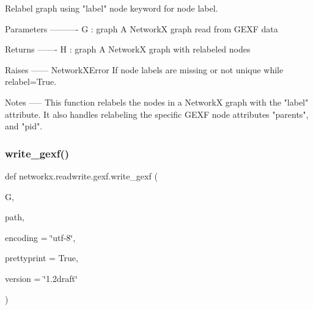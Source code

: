 \begin{DoxyVerb}Relabel graph using "label" node keyword for node label.

Parameters
----------
G : graph
   A NetworkX graph read from GEXF data

Returns
-------
H : graph
  A NetworkX graph with relabeled nodes

Raises
------
NetworkXError
    If node labels are missing or not unique while relabel=True.

Notes
-----
This function relabels the nodes in a NetworkX graph with the
"label" attribute.  It also handles relabeling the specific GEXF
node attributes "parents", and "pid".
\end{DoxyVerb}
 \mbox{\label{namespacenetworkx_1_1readwrite_1_1gexf_a845d783cb876a84982ea1eb9707055d9}} 
\subsubsection{\texorpdfstring{write\+\_\+gexf()}{write\_gexf()}}
{\footnotesize\ttfamily def networkx.\+readwrite.\+gexf.\+write\+\_\+gexf (\begin{DoxyParamCaption}\item[{}]{G,  }\item[{}]{path,  }\item[{}]{encoding = {\ttfamily \char`\"{}utf-\/8\char`\"{}},  }\item[{}]{prettyprint = {\ttfamily True},  }\item[{}]{version = {\ttfamily \char`\"{}1.2draft\char`\"{}} }\end{DoxyParamCaption})}

